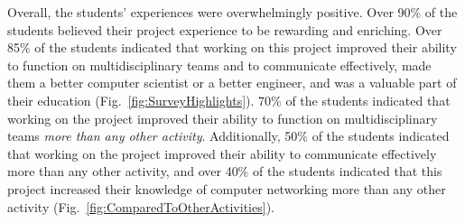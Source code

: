 \documentclass[journal,twopages]{IEEEtran}
\begin{document}
Overall, the students' experiences were overwhelmingly positive. Over 90\% of the students
believed their project experience to be rewarding and enriching. Over 85\% of the students indicated that working on this project improved their ability to function on multidisciplinary teams and to communicate effectively, made them a better computer scientist or a better engineer, and was a valuable part of their education (Fig.~\ref{fig:SurveyHighlights}).
70\% of the students indicated that working on the project improved their ability to function on multidisciplinary teams \emph{more than any other activity}. Additionally, 50\% of the students indicated that working on the project improved their ability to communicate effectively more than any other activity, and over 40\% of the students indicated that this project increased their knowledge of computer networking more than any other activity (Fig.~\ref{fig:ComparedToOtherActivities}).
\end{document}
